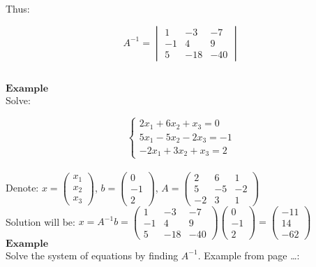 \documentclass[]{article}
\begin{document}
Thus:\\
 \hspace{2cm}

\[A^{-1}=\begin{vmatrix} 1 &   -3 &   -7\\ -1 &   4 &   9 \\ 5 &   -18 &   -40 \end{vmatrix}\]\\
 \newpage

\(\mathbf{Example}\)\\
 Solve:

\[\begin{cases} 2x_1 + 6x_2 +x_3 = 0\\ 5x_1 - 5x_2 - 2x_3 = -1\\-2x_1 + 3x_2 +x_3 = 2 \end{cases}\]\\

Denote: \(x=\begin{pmatrix} x_1\\ x_2\\ x_3 \end{pmatrix}\),
\(b=\begin{pmatrix} 0\\ -1\\ 2 \end{pmatrix}\),
\(A=\begin{pmatrix} 2 & 6 & 1\\ 5 & -5 & -2 \\ -2 & 3 & 1 \end{pmatrix}\)\\

Solution will be:
\(x = A^{-1}b=\begin{pmatrix} 1 & -3 & -7\\ -1 & 4 & 9 \\ 5 & -18 & -40 \end{pmatrix}\begin{pmatrix} 0\\ -1\\ 2 \end{pmatrix}=\begin{pmatrix} -11\\ 14\\ -62 \end{pmatrix}\)\\

\(\mathbf{Example}\)\\

Solve the system of equations by finding \(A^{-1}\). Example from page
\ldots{}:
\end{document}

